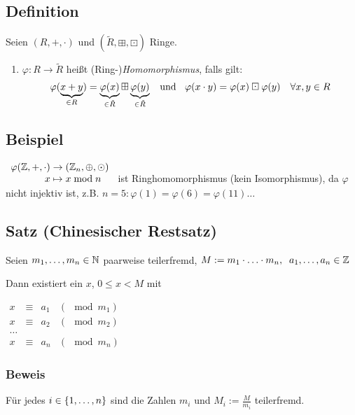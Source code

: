 \subsection[Definition: Homomorphismus, Isomorphismus]{Definition}

Seien $(R, +, \cdot)$ und $(\tilde{R}, \boxplus, \boxdot)$ Ringe.

{\renewcommand{\labelenumi}{(\roman{enumi})}
\begin{enumerate}
	\item
	$\varphi: R \to \tilde{R}$ heißt (Ring-)\emph{Homomorphismus}, falls gilt:
	\[\varphi(\underbrace{x+y}_{\in R}) = \underbrace{\varphi(x)}_{\in \tilde{R}} \boxplus \underbrace{\varphi(y)}_{\in \tilde{R}}
	\text{\;\; und \;\;}
	\varphi(x \cdot y) = \varphi(x) \boxdot \varphi(y) \quad \forall x, y \in R\]
	
\end{enumerate}}

\subsection{Beispiel}

$\begin{array}[b]{r@{\;}c@{\;}l}
	\varphi(\Z, +, \cdot) &\to&  (\Z_n, \oplus, \odot) \\
	x	&\mapsto& x \mod n 
\end{array}$
ist Ringhomomorphismus (kein Isomorphismus), da $\varphi$ nicht injektiv ist, z.B. $n=5: \varphi(1)= \varphi(6) = \varphi(11) \dots$

\subsection[Satz: Chinesischer Restsatz]{Satz (Chinesischer Restsatz)} \label{chin.restsatz}

Seien $m_1, \dots, m_n \in \mathbb{N}$ paarweise teilerfremd,
$M := m_1 \cdot \ldots \cdot m_n, \;\; a_1, \dots, a_n \in \mathbb{Z}$

Dann existiert ein $x$, $0 \leq x < M$ mit 

$\begin{array}{lcll}
x &\equiv& a_1	& (\mod m_1) \\
x &\equiv& a_2	& (\mod m_2) \\
\dots \\
x &\equiv& a_n	& (\mod m_n)
\end{array}$

\subsubsection*{Beweis}
Für jedes $i \in \left\{1, \dots, n\right\}$ sind die Zahlen $m_i$ und $M_i := \frac{M}{m_i}$ teilerfremd.


